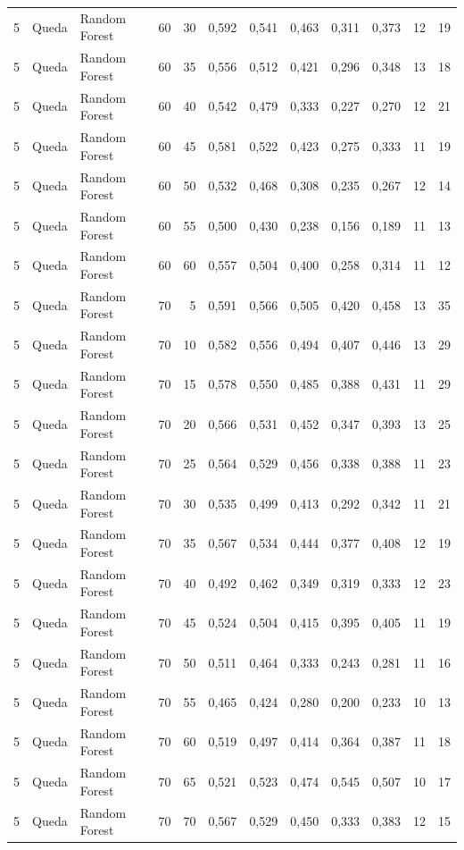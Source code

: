 \begin{longtable}{@{}rllrrrrrrrrr@{}}
5 & Queda & Random Forest & 60 & 30 & 0,592 & 0,541 & 0,463 & 0,311 & 0,373 & 12 & 19 \\
5 & Queda & Random Forest & 60 & 35 & 0,556 & 0,512 & 0,421 & 0,296 & 0,348 & 13 & 18 \\
5 & Queda & Random Forest & 60 & 40 & 0,542 & 0,479 & 0,333 & 0,227 & 0,270 & 12 & 21 \\
5 & Queda & Random Forest & 60 & 45 & 0,581 & 0,522 & 0,423 & 0,275 & 0,333 & 11 & 19 \\
5 & Queda & Random Forest & 60 & 50 & 0,532 & 0,468 & 0,308 & 0,235 & 0,267 & 12 & 14 \\
5 & Queda & Random Forest & 60 & 55 & 0,500 & 0,430 & 0,238 & 0,156 & 0,189 & 11 & 13 \\
5 & Queda & Random Forest & 60 & 60 & 0,557 & 0,504 & 0,400 & 0,258 & 0,314 & 11 & 12 \\
5 & Queda & Random Forest & 70 & 5 & 0,591 & 0,566 & 0,505 & 0,420 & 0,458 & 13 & 35 \\
5 & Queda & Random Forest & 70 & 10 & 0,582 & 0,556 & 0,494 & 0,407 & 0,446 & 13 & 29 \\
5 & Queda & Random Forest & 70 & 15 & 0,578 & 0,550 & 0,485 & 0,388 & 0,431 & 11 & 29 \\
5 & Queda & Random Forest & 70 & 20 & 0,566 & 0,531 & 0,452 & 0,347 & 0,393 & 13 & 25 \\
5 & Queda & Random Forest & 70 & 25 & 0,564 & 0,529 & 0,456 & 0,338 & 0,388 & 11 & 23 \\
5 & Queda & Random Forest & 70 & 30 & 0,535 & 0,499 & 0,413 & 0,292 & 0,342 & 11 & 21 \\
5 & Queda & Random Forest & 70 & 35 & 0,567 & 0,534 & 0,444 & 0,377 & 0,408 & 12 & 19 \\
5 & Queda & Random Forest & 70 & 40 & 0,492 & 0,462 & 0,349 & 0,319 & 0,333 & 12 & 23 \\
5 & Queda & Random Forest & 70 & 45 & 0,524 & 0,504 & 0,415 & 0,395 & 0,405 & 11 & 19 \\
5 & Queda & Random Forest & 70 & 50 & 0,511 & 0,464 & 0,333 & 0,243 & 0,281 & 11 & 16 \\
5 & Queda & Random Forest & 70 & 55 & 0,465 & 0,424 & 0,280 & 0,200 & 0,233 & 10 & 13 \\
5 & Queda & Random Forest & 70 & 60 & 0,519 & 0,497 & 0,414 & 0,364 & 0,387 & 11 & 18 \\
5 & Queda & Random Forest & 70 & 65 & 0,521 & 0,523 & 0,474 & 0,545 & 0,507 & 10 & 17 \\
5 & Queda & Random Forest & 70 & 70 & 0,567 & 0,529 & 0,450 & 0,333 & 0,383 & 12 & 15 \\

\end{longtable}
